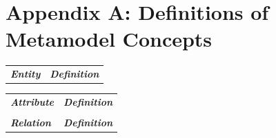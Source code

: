 \documentclass[a4paper]{llncs}
\begin{document}



\clearpage
\section*{Appendix A: Definitions of Metamodel Concepts}
\begin{minipage}{1\linewidth}
\begin{minipage}{0.30\textwidth} 

\begin{table}[H]
\vspace{-1.0cm}
\fontsize{6}{6.5}\selectfont

\begin{tabular}{l p{4.6cm}}

\textbf{\textit{Entity}} & \textbf{\textit{Definition}}  \\

 \end{tabular}
\end{table}
\end{minipage}
 \hspace{4em plus 1fill} 
\begin{minipage}{0.46\textwidth} 
 \begin{table}[H]
\fontsize{6}{6.5}\selectfont
\vspace{-1.0cm}
\label{table-entities}
\begin{tabular}{|l p{4.1cm}}
 
\textbf{\textit{Attribute}} & \textbf{\textit{Definition}}  \\ 

 & \\
 \textbf{\textit{Relation}} & \textbf{\textit{Definition}}  \\ 


\end{tabular}
\end{table}

\end{minipage}
\end{minipage}
\end{document}
